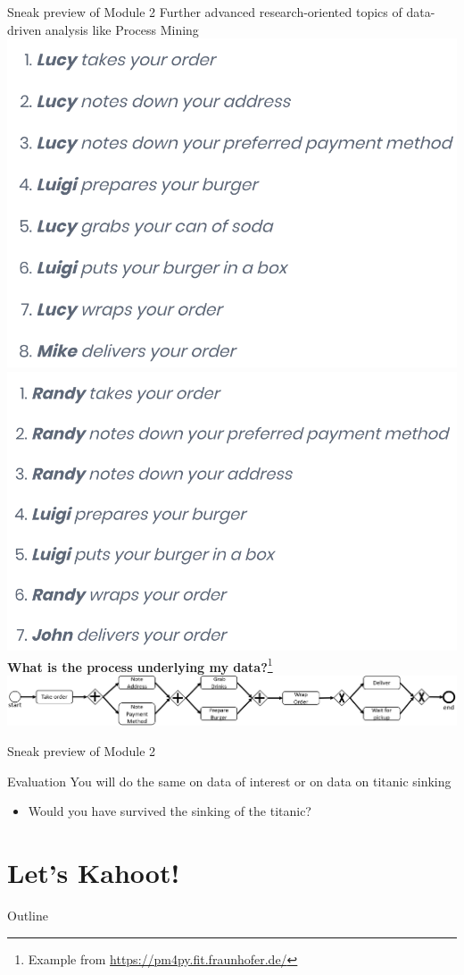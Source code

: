 \documentclass{beamer}%
\begin{document}
\begin{frame}{Sneak preview of Module 2}
	\centering 
	Further advanced research-oriented topics of data-driven analysis like Process Mining \\
	
	\includegraphics[width=0.4\linewidth]{figures/lucy.png}
	\includegraphics[width=0.4\linewidth]{figures/randy.png}\\
		\textbf{What is the process underlying my data?}\footnote{Example from \url{https://pm4py.fit.fraunhofer.de/}}\\
	\includegraphics[width=0.9\linewidth]{figures/simple_sample_model.png}
	
\end{frame}

\begin{frame}{Sneak preview of Module 2}
	\begin{block}{Evaluation}
		You will do the same on data of interest or on data on titanic sinking
	\begin{itemize}
		\item Would you have survived the sinking of the titanic?
	\end{itemize}				
	\end{block}
\end{frame}

\section{Let's Kahoot!}
\begin{frame}{Outline}
	\tableofcontents[currentsection]
\end{frame}
\end{document}
